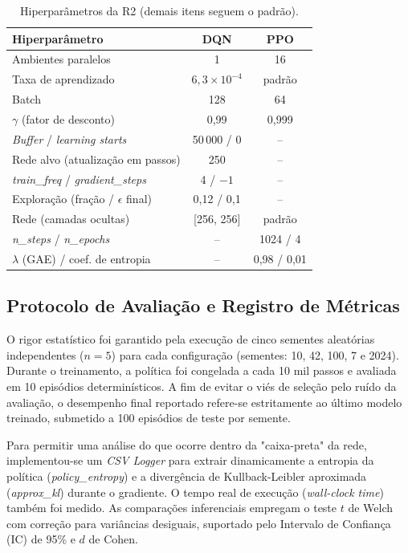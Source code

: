 \documentclass[conference]{IEEEtran}
\begin{document}
\begin{table}[tb]
\caption{Hiperparâmetros da R2 (demais itens seguem o padrão).}
\label{tab:hp}
\begin{center}
\footnotesize
\begin{tabular}{lcc}
\toprule
\textbf{Hiperparâmetro} & \textbf{DQN} & \textbf{PPO} \\
\midrule
Ambientes paralelos & 1 & 16 \\
Taxa de aprendizado & $6{,}3\times10^{-4}$ & padrão \\
Batch & 128 & 64 \\
$\gamma$ (fator de desconto) & 0,99 & 0,999 \\
\textit{Buffer} / \textit{learning starts} & 50\,000 / 0 & -- \\
Rede alvo (atualização em passos) & 250 & -- \\
\textit{train\_freq} / \textit{gradient\_steps} & 4 / $-1$ & -- \\
Exploração (fração / $\epsilon$ final) & 0,12 / 0,1 & -- \\
Rede (camadas ocultas) & [256, 256] & padrão \\
\textit{n\_steps} / \textit{n\_epochs} & -- & 1024 / 4 \\
$\lambda$ (GAE) / coef. de entropia & -- & 0,98 / 0,01 \\
\bottomrule
\end{tabular}
\end{center}
\end{table}

\subsection{Protocolo de Avaliação e Registro de Métricas}
O rigor estatístico foi garantido pela execução de cinco sementes aleatórias independentes ($n=5$) para cada configuração (sementes: 10, 42, 100, 7 e 2024). Durante o treinamento, a política foi congelada a cada 10 mil passos e avaliada em 10 episódios determinísticos. A fim de evitar o viés de seleção pelo ruído da avaliação, o desempenho final reportado refere-se estritamente ao último modelo treinado, submetido a 100 episódios de teste por semente. 

Para permitir uma análise do que ocorre dentro da "caixa-preta" da rede, implementou-se um \textit{CSV Logger} para extrair dinamicamente a entropia da política (\textit{policy\_entropy}) e a divergência de Kullback-Leibler aproximada (\textit{approx\_kl}) durante o gradiente. O tempo real de execução (\textit{wall-clock time}) também foi medido. As comparações inferenciais empregam o teste $t$ de Welch com correção para variâncias desiguais, suportado pelo Intervalo de Confiança (IC) de 95\% e $d$ de Cohen. 
\end{document}
